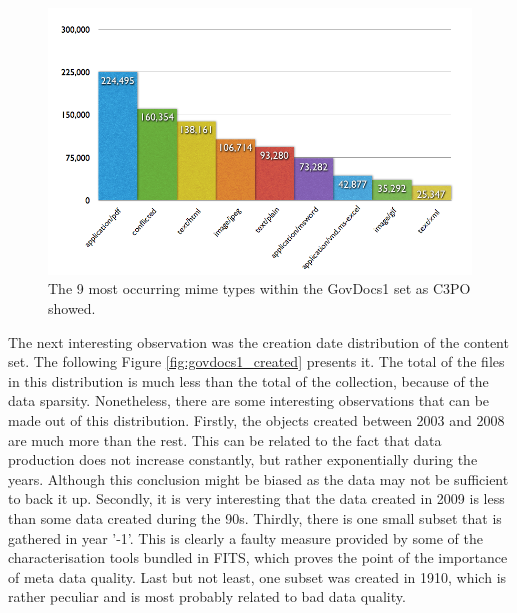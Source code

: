 \begin{figure}[th]
\begin{center}
\includegraphics[width=\textwidth]{figures/usecases/govdocs1/mimetypes_govdocs1.png}
\caption{The 9 most occurring mime types within the GovDocs1 set as C3PO showed.}
\label{fig:govdocs1_mimetypes}
\end{center}
\end{figure}

The next interesting observation was the creation date distribution of the content set.
The following Figure \ref{fig:govdocs1_created} presents it.
The total of the files in this distribution is much less than the total of the collection, because of the data sparsity.
Nonetheless, there are some interesting observations that can be made out of this distribution.
Firstly, the objects created between 2003 and 2008 are much more than the rest.
This can be related to the fact that data production does not increase constantly, but rather exponentially during the years.
Although this conclusion might be biased as the data may not be sufficient to back it up.
Secondly, it is very interesting that the data created in 2009 is  less than some data created during the 90s.
Thirdly, there is one small subset that is gathered in year '-1'.
This is clearly a faulty measure provided by some of the characterisation tools bundled in FITS, which proves the point of the importance of meta data quality.
Last but not least, one subset was created in 1910, which is rather peculiar and is most probably related to bad data quality.

